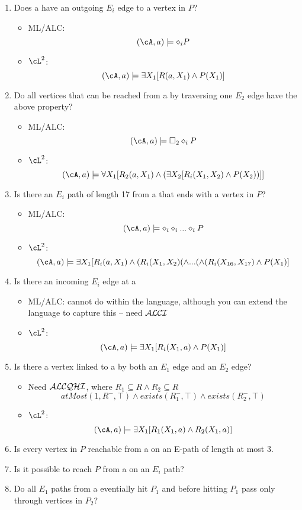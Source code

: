 \begin{enumerate}
\item Does a have an outgoing $E_i$ edge to a vertex in $P$?
\begin{itemize}
\item ML/ALC:  \[ (\cA,a) \models \diamond_i P \]
\item $\cL^2$: \[ (\cA,a) \models 
	\exists X_1 [ R(a,X_1) \wedge P(X_1) ] \]
\end{itemize}

\item Do all vertices that can be reached from a by traversing one
$E_2$ edge have the above property?
\begin{itemize}
\item ML/ALC:  \[ (\cA,a) \models \square_2 \diamond_i P \]
\item $\cL^2$: \[ (\cA,a) \models \forall X_1 [R_2(a,X_1) \wedge
	( \exists X_2 [ R_i(X_1,X_2) \wedge P(X_2)) ] ] \]
\end{itemize}

\item Is there an $E_i$ path of length 17 from a that ends with a
	vertex in $P$?
\begin{itemize}
\item ML/ALC:  \[ (\cA,a) \models \diamond_i \diamond_i ... \diamond_i P \]
\item $\cL^2$: \[ (\cA,a) \models 
	\exists X_1 [ R_i(a,X_1) \wedge (R_i(X_1,X_2) (\wedge ... 
			(\wedge (R_i(X_{16},X_{17}) \wedge P(X_1) ] \]
\end{itemize}
\item Is there an incoming $E_i$ edge at a
\begin{itemize}
\item ML/ALC: cannot do within the language, although you can extend
			the language to capture this -- need ${\cal ALCI}$
\item $\cL^2$: \[ (\cA,a) \models 
	\exists X_1 [ R_i(X_1,a) \wedge P(X_1) ] \]
\end{itemize}
\item Is there a vertex linked to a by both an $E_1$ edge and an $E_2$
edge? 
\begin{itemize}
\item Need ${\cal ALCQHI}$, where $R_1 \subseteq R \wedge R_2 \subseteq R$
\[ atMost(1,R^-,\top) \wedge exists(R_1^-,\top) \wedge exists(R_2^-,\top)
\]
\item $\cL^2$: \[ (\cA,a) \models 
	\exists X_1 [ R_1(X_1,a) \wedge R_2(X_1,a) ] \]
\end{itemize}
\item Is every vertex in $P$ reachable from a on an E-path of length at most 3.
\item Is it possible to reach $P$ from a on an $E_i$ path?
\item Do all $E_1$ paths from a eventially hit $P_1$ and before hitting
$P_1$ pass only through vertices in $P_2$? 
\end{enumerate}

